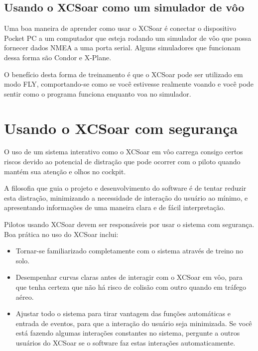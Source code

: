 \subsection*{Usando o XCSoar como um simulador de vôo}
Uma boa maneira de aprender como usar o XCSoar é conectar o dispositivo Pocket PC a um computador que esteja rodando um simulador de vôo que possa fornecer dados NMEA a uma porta serial.  Alguns simuladores que funcionam dessa forma são Condor e X-Plane. 

O benefício desta forma de treinamento é que o XCSoar pode ser utilizado em modo FLY, comportando-se como se você estivesse realmente voando e você pode sentir como o programa funciona enquanto voa no simulador.

\section{Usando o XCSoar com segurança}\label{sec:usingxcsoarsafely}\label{conf:usingxcsoarsafely}
O uso de um sistema interativo como o XCSoar em vôo carrega consigo certos riscos devido ao potencial de distração que pode ocorrer com o piloto quando mantém sua atenção e olhos no cockpit.

A filosofia que guia o projeto e desenvolvimento do software é de tentar reduzir esta distração, minimizando a necessidade de interação do usuário ao mínimo, e apresentando informações de uma maneira clara e de fácil interpretação.

Pilotos usando XCSoar devem ser responsáveis por usar o sistema com segurança.  Boa prática no uso do XCSoar inclui:

\begin{itemize}
\item Tornar-se familiarizado completamente com o sistema através de treino no solo.
\item Desempenhar curvas claras antes de interagir com o XCSoar em vôo, para que tenha certeza que não há risco de colisão com outro quando em tráfego aéreo.
\item Ajustar todo o sistema para tirar vantagem das funções automáticas e entrada de eventos, para que a interação do usuário seja minimizada.  Se você está fazendo algumas interações constantes no sistema, pergunte a outros usuários do XCSoar se o software faz estas interações automaticamente.
 

\end{itemize}
